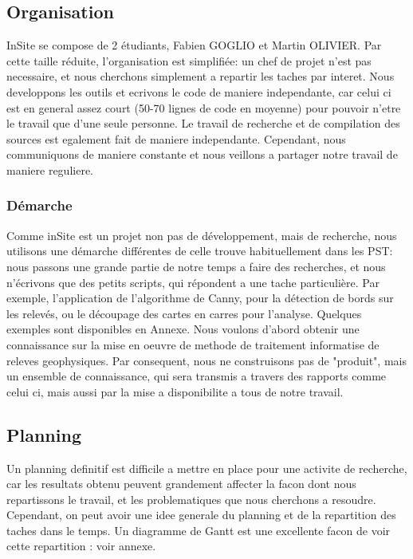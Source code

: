 \documentclass[a4paper, 12pt, titlepage, oneside, french]{article}
\begin{document}
	\subsection{Organisation}
	InSite se compose de 2 étudiants, Fabien GOGLIO et Martin OLIVIER. Par cette taille réduite, l'organisation est simplifiée: un chef de projet n'est pas necessaire, et nous cherchons simplement a repartir les taches par interet. Nous developpons les outils et ecrivons le code de maniere independante, car celui ci est en general assez court (50-70 lignes de code en moyenne) pour pouvoir n'etre le travail que d'une seule personne. Le travail de recherche et de compilation des sources est egalement fait de maniere independante. Cependant, nous communiquons de maniere constante et nous veillons a partager notre travail de maniere reguliere.   
	\subsubsection{Démarche}
	Comme inSite est un projet non pas de développement, mais de recherche, nous utilisons une démarche différentes de celle trouve habituellement dans les PST: nous passons une grande partie de notre temps a faire des recherches, et nous n'écrivons que des petits scripts, qui répondent a une tache particulière. Par exemple, l'application de l'algorithme de Canny, pour la détection de bords sur les relevés, ou le découpage des cartes en carres pour l'analyse. Quelques exemples sont disponibles en Annexe. Nous voulons d'abord obtenir une connaissance sur la mise en oeuvre de methode de traitement informatise de releves geophysiques. Par consequent, nous ne construisons pas de "produit", mais un ensemble de connaissance, qui sera transmis a travers des rapports comme celui ci, mais aussi par la mise a disponibilite a tous de notre travail.
	\subsection{Planning}
	Un planning definitif est difficile a mettre en place pour une activite de recherche, car les resultats obtenu peuvent grandement affecter la facon dont nous repartissons le travail, et les problematiques que nous cherchons a resoudre. Cependant, on peut avoir une idee generale du planning et de la repartition des taches dans le temps. Un diagramme de Gantt est une excellente facon de voir cette repartition : voir annexe.
\newpage
\end{document}
